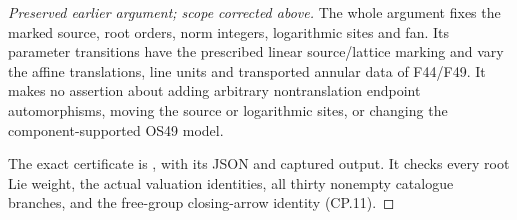 \begin{proof}[Preserved earlier argument; scope corrected above]
The whole argument fixes the marked source, root orders, norm
integers, logarithmic sites and fan. Its parameter transitions have
the prescribed linear source/lattice marking and vary the affine
translations, line units and transported annular data of F44/F49.
It makes no assertion about adding arbitrary nontranslation endpoint
automorphisms, moving the source or logarithmic sites, or changing
the component-supported OS49 model.

The exact certificate is ,
with its JSON and captured output. It checks every root Lie weight,
the actual valuation identities, all thirty nonempty catalogue
branches, and the free-group closing-arrow identity (CP.11).

\end{proof}
